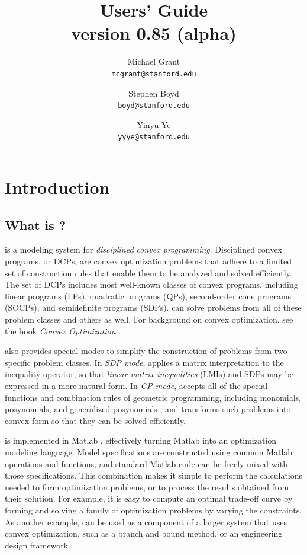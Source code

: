 \documentclass[12pt]{article}
\title{\cvx Users' Guide\\\large version 0.85 (alpha)}
\author{Michael Grant\\\texttt{mcgrant@stanford.edu} 
\and Stephen Boyd\\\texttt{boyd@stanford.edu}
\and Yinyu Ye\\\texttt{yyye@stanford.edu}}
\begin{document}
\maketitle
\tableofcontents

\section{Introduction}

\subsection{What is \cvx?}

\cvx is a modeling system for \emph{disciplined convex programming}. 
Disciplined convex programs, or DCPs, are convex optimization problems 
that adhere to a limited set of construction rules that 
enable them to be analyzed and solved efficiently. The set of 
DCPs includes most well-known classes of convex programs, including
linear programs (LPs), quadratic programs (QPs), second-order
cone programs (SOCPs), and semidefinite programs (SDPs). 
\cvx can solve problems from all of these problem classes and others as well.
For background on convex optimization,
see the book \emph{Convex Optimization} \cite{BV:04}.

\cvx also provides special modes to simplify the construction of problems
from two specific problem classes. In \emph{SDP mode}, \cvx applies
a matrix interpretation to the inequality operator, so that
\emph{linear matrix inequalities} (LMIs) and SDPs may be expressed
in a more natural form. In \emph{GP mode}, \cvx accepts all of the
special functions and combination rules of geometric programming,
including monomials, posynomials, and generalized posynomials \cite{BKVH:05},
and transforms such problems into convex form
so that they can be solved efficiently.

\cvx is implemented in Matlab \cite{MATLAB}, effectively
turning Matlab into an optimization modeling language.
Model specifications are constructed using common Matlab
operations and functions, and standard Matlab code can be
freely mixed with those specifications. This combination
makes it simple to perform the calculations
needed to form optimization problems, or to process the
results obtained from their solution. For example, it is easy
to compute an optimal trade-off curve
by forming and solving a family of optimization problems
by varying the constraints. As another example, \cvx can
be used as a component of a larger system that uses convex
optimization, such as a branch and bound method,
or an engineering design framework.
\end{document}
